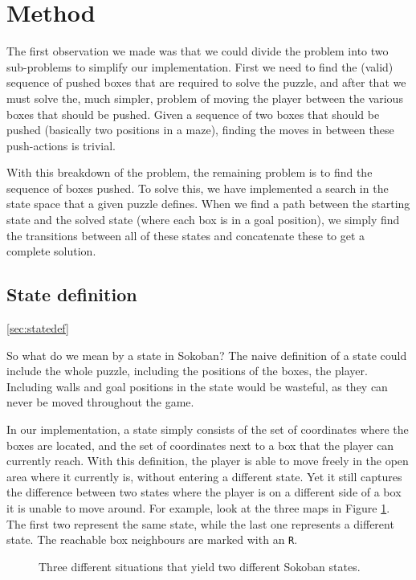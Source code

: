 \documentclass[a4paper,11pt]{article}
\begin{document}
\section{Method}

The first observation we made was that we could divide the problem into two sub-problems
to simplify our implementation.
First we need to find the (valid) sequence of pushed boxes that are required to solve
the puzzle, and after that we must solve the, much simpler, problem of moving the player
between the various boxes that should be pushed.
Given a sequence of two boxes that should be pushed (basically two positions in a maze),
finding the moves in between these push-actions is trivial.

With this breakdown of the problem, the remaining problem is to find the
sequence of boxes pushed.
To solve this, we have implemented a search in the state space that a given puzzle defines.
When we find a path between the starting state and the solved state (where each box is in a goal position),
we simply find the transitions between all of these states and concatenate these to get a complete solution.

\subsection{State definition}
\ref{sec:statedef}

So what do we mean by a state in Sokoban?
The naive definition of a state could include the whole puzzle,
including the positions of the boxes, the player.
Including walls and goal positions in the state would be wasteful,
as they can never be moved throughout the game.

In our implementation, a state simply consists of the set of coordinates where the boxes are located,
and the set of coordinates next to a box that the player can currently reach.
With this definition, the player is able to move freely in the
open area where it currently is, without entering a different state.
Yet it still captures the difference between two states where the player is on a different side of a
box it is unable to move around.
For example, look at the three maps in Figure \ref{example:states}.
The first two represent the same state,
while the last one represents a different state.
The reachable box neighbours are marked with an \verb!R!.

\begin{figure}[h!]
	\centering
\begin{center}
\end{center}
	\label{example:states}
	\caption{
		Three different situations that yield two different Sokoban states.
	}
\end{figure}
\end{document}
